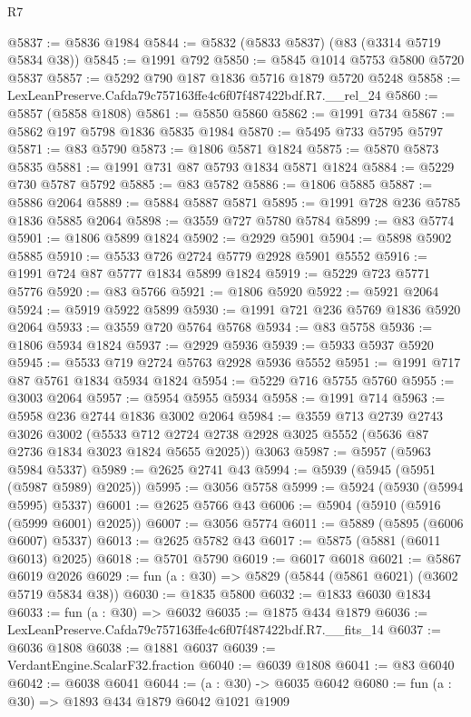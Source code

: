 \begin{lexlean}{R7}
\begin{coremodule}
@5837 := @5836 @1984
@5844 := @5832 (@5833 @5837) (@83 (@3314 @5719 @5834 @38))
@5845 := @1991 @792
@5850 := @5845 @1014 @5753 @5800 @5720 @5837
@5857 := @5292 @790 @187 @1836 @5716 @1879 @5720 @5248
@5858 := LexLeanPreserve.Cafda79c757163ffe4c6f07f487422bdf.R7.__rel_24
@5860 := @5857 (@5858 @1808)
@5861 := @5850 @5860
@5862 := @1991 @734
@5867 := @5862 @197 @5798 @1836 @5835 @1984
@5870 := @5495 @733 @5795 @5797
@5871 := @83 @5790
@5873 := @1806 @5871 @1824
@5875 := @5870 @5873 @5835
@5881 := @1991 @731 @87 @5793 @1834 @5871 @1824
@5884 := @5229 @730 @5787 @5792
@5885 := @83 @5782
@5886 := @1806 @5885
@5887 := @5886 @2064
@5889 := @5884 @5887 @5871
@5895 := @1991 @728 @236 @5785 @1836 @5885 @2064
@5898 := @3559 @727 @5780 @5784
@5899 := @83 @5774
@5901 := @1806 @5899 @1824
@5902 := @2929 @5901
@5904 := @5898 @5902 @5885
@5910 := @5533 @726 @2724 @5779 @2928 @5901 @5552
@5916 := @1991 @724 @87 @5777 @1834 @5899 @1824
@5919 := @5229 @723 @5771 @5776
@5920 := @83 @5766
@5921 := @1806 @5920
@5922 := @5921 @2064
@5924 := @5919 @5922 @5899
@5930 := @1991 @721 @236 @5769 @1836 @5920 @2064
@5933 := @3559 @720 @5764 @5768
@5934 := @83 @5758
@5936 := @1806 @5934 @1824
@5937 := @2929 @5936
@5939 := @5933 @5937 @5920
@5945 := @5533 @719 @2724 @5763 @2928 @5936 @5552
@5951 := @1991 @717 @87 @5761 @1834 @5934 @1824
@5954 := @5229 @716 @5755 @5760
@5955 := @3003 @2064
@5957 := @5954 @5955 @5934
@5958 := @1991 @714
@5963 := @5958 @236 @2744 @1836 @3002 @2064
@5984 := @3559
    @713
    @2739
    @2743
    @3026
    @3002
    (@5533 @712 @2724 @2738 @2928 @3025 @5552 (@5636 @87 @2736 @1834 @3023 @1824 @5655 @2025))
    @3063
@5987 := @5957 (@5963 @5984 @5337)
@5989 := @2625 @2741 @43
@5994 := @5939 (@5945 (@5951 (@5987 @5989) @2025))
@5995 := @3056 @5758
@5999 := @5924 (@5930 (@5994 @5995) @5337)
@6001 := @2625 @5766 @43
@6006 := @5904 (@5910 (@5916 (@5999 @6001) @2025))
@6007 := @3056 @5774
@6011 := @5889 (@5895 (@6006 @6007) @5337)
@6013 := @2625 @5782 @43
@6017 := @5875 (@5881 (@6011 @6013) @2025)
@6018 := @5701 @5790
@6019 := @6017 @6018
@6021 := @5867 @6019 @2026
@6029 := fun (a : @30) => @5829 (@5844 (@5861 @6021) (@3602 @5719 @5834 @38))
@6030 := @1835 @5800
@6032 := @1833 @6030 @1834
@6033 := fun (a : @30) => @6032
@6035 := @1875 @434 @1879
@6036 := LexLeanPreserve.Cafda79c757163ffe4c6f07f487422bdf.R7.__fits_14
@6037 := @6036 @1808
@6038 := @1881 @6037
@6039 := VerdantEngine.ScalarF32.fraction
@6040 := @6039 @1808
@6041 := @83 @6040
@6042 := @6038 @6041
@6044 := (a : @30) -> @6035 @6042
@6080 := fun (a : @30) =>
  @1893
    @434
    @1879
    @6042
    @1021
    @1909

\end{coremodule}
\end{lexlean}
